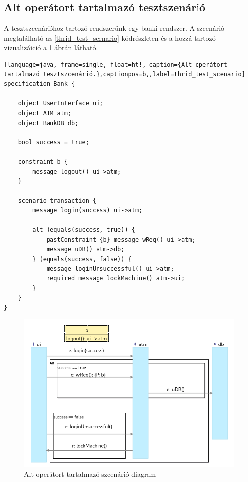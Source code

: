 \clearpage\subsection{Alt operátort tartalmazó tesztszenárió}

A tesztszcenárióhoz tartozó rendszerünk egy banki rendszer.
A szcenárió megtalálható az \ref{thrid_test_scenario} kódrészleten és a hozzá tartozó vizualizáició a \ref{third_visualisation} ábrán látható.

\begin{lstlisting}[language=java, frame=single, float=ht!, caption={Alt operátort tartalmazó tesztszcenárió.},captionpos=b,,label=thrid_test_scenario]
specification Bank {

    object UserInterface ui;
    object ATM atm;
    object BankDB db;

    bool success = true;

    constraint b {
        message logout() ui->atm;
    }

    scenario transaction {
        message login(success) ui->atm;

        alt (equals(success, true)) {
            pastConstraint {b} message wReq() ui->atm;
            message uDB() atm->db;
        } (equals(success, false)) {
            message loginUnsuccessful() ui->atm;
            required message lockMachine() atm->ui;
        }
    }
}
\end{lstlisting}

\begin{figure}[!ht]
    \centering
    \includegraphics[width=150mm, keepaspectratio]{figures/diagramAltExample.png}
    \caption{Alt operátort tartalmazó szcenárió diagram}
    \label{third_visualisation}
\end{figure}

